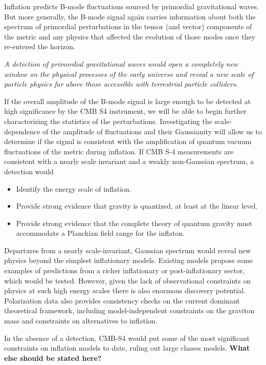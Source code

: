 Inflation predicts B-mode fluctuations sourced by primordial gravitational waves. But more generally, the B-mode signal again carries information about both the spectrum of primordial perturbations in the tensor (and vector) components of the metric and any physics that affected the evolution of those modes once they re-entered the horizon.  

{\it A detection of primordial gravitational waves would open a completely new window on the physical processes of the early universe and reveal a new scale of particle physics far above those accessible with terrestrial particle colliders. }

If the overall amplitude of the B-mode signal is large enough to be detected at high significance by the CMB S4 instrument, we will be able to begin further characterizing the statistics of the perturbations. Investigating the scale-dependence of the amplitude of fluctuations and their Gaussianity will allow us to determine if the signal is consistent with the amplification of quantum vacuum fluctuations of the metric during inflation. If CMB S-4 measurements are consistent with a nearly scale invariant and a weakly non-Gaussian spectrum, a detection would
\begin{itemize}
 \item Identify the energy scale of inflation. 
  \item Provide strong evidence that gravity is quantized, at least at the linear level.
 \item Provide strong evidence that the complete theory of quantum gravity must accommodate a Planckian field range for the inflaton.
\end{itemize}

Departures from a nearly scale-invariant, Gaussian spectrum would reveal new physics beyond the simplest inflationary models. Existing models propose some examples of predictions from a richer inflationary or post-inflationary sector, which would be tested. However, given the lack of observational constraints on physics at such high energy scales there is also enormous discovery potential. Polarization data also provides consistency checks on the current dominant theoretical framework, including model-independent constraints on the graviton mass and constraints on alternatives to inflation.

In the absence of a detection, CMB-S4 would put some of the most significant constraints on inflation models to date, ruling out large classes models. {\bf What else should be stated here?}


